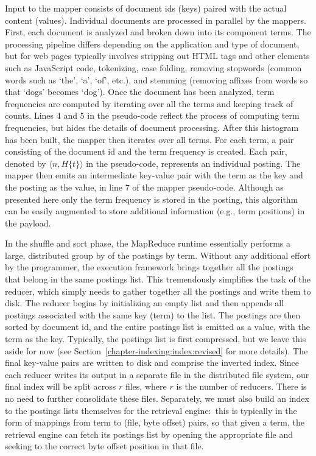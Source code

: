 Input to the mapper consists of document ids (keys) paired with the
actual content (values).  Individual documents are processed in
parallel by the mappers.  First, each document is analyzed and broken
down into its component terms.  The processing pipeline differs
depending on the application and type of document, but for web pages
typically involves stripping out HTML tags and other elements such as
JavaScript code, tokenizing, case folding, removing stopwords (common
words such as `the', `a', `of', etc.), and stemming (removing affixes
from words so that `dogs' becomes `dog').  Once the document has been
analyzed, term frequencies are computed by iterating over all the
terms and keeping track of counts.  Lines 4 and 5 in the pseudo-code
reflect the process of computing term frequencies, but hides the
details of document processing.  After this histogram has been built,
the mapper then iterates over all terms.  For each term, a pair
consisting of the document id and the term frequency is created.  Each
pair, denoted by $\langle n, H\{t\} \rangle$ in the pseudo-code,
represents an individual posting.  The mapper then emits an
intermediate key-value pair with the term as the key and the posting
as the value, in line 7 of the mapper pseudo-code.  Although as
presented here only the term frequency is stored in the posting, this
algorithm can be easily augmented to store additional information
(e.g., term positions) in the payload.

In the shuffle and sort phase, the MapReduce runtime essentially
performs a large, distributed group by of the postings by term.
Without any additional effort by the programmer, the execution
framework brings together all the postings that belong in the same
postings list.  This tremendously simplifies the task of the reducer,
which simply needs to gather together all the postings and write them
to disk.  The reducer begins by initializing an empty list and then
appends all postings associated with the same key (term) to the list.
The postings are then sorted by document id, and the entire postings
list is emitted as a value, with the term as the key.  Typically, the
postings list is first compressed, but we leave this aside for now
(see Section~\ref{chapter-indexing:index:revised} for more details).
The final key-value pairs are written to disk and comprise the
inverted index.  Since each reducer writes its output in a separate
file in the distributed file system, our final index will be split
across $r$ files, where $r$ is the number of reducers.  There is no
need to further consolidate these files.  Separately, we must also
build an index to the postings lists themselves for the retrieval
engine:\ this is typically in the form of mappings from term to (file,
byte offset) pairs, so that given a term, the retrieval engine can
fetch its postings list by opening the appropriate file and seeking to
the correct byte offset position in that file.

